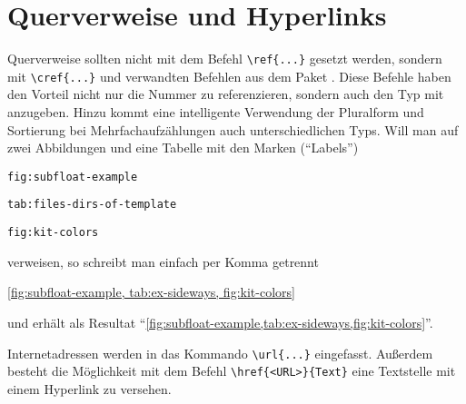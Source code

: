 \section{Querverweise und Hyperlinks}%
\label{sec:Querverweise}
%
Querverweise sollten nicht mit dem Befehl \lstinline|\ref{...}| gesetzt werden,
sondern mit \lstinline|\cref{...}| und verwandten Befehlen aus dem Paket
 \cite{Cubitt2013}.
Diese Befehle haben den Vorteil nicht nur die Nummer zu referenzieren,
sondern auch den Typ mit anzugeben.
Hinzu kommt eine intelligente Verwendung der Pluralform und
Sortierung bei Mehrfachaufzählungen auch unterschiedlichen Typs.
Will man \bspw auf zwei Abbildungen und eine Tabelle mit den Marken (\enquote{Labels})
%
\begin{itemize*}
\item \texttt{fig:subfloat-example}
\item \texttt{tab:files-dirs-of-template}
\item \texttt{fig:kit-colors}
\end{itemize*}
%
verweisen, so schreibt man einfach per Komma getrennt
%
\begin{latex}[caption={Cleveres Referenzieren mit \bs cref},label={lst:cref}]
\cref{fig:subfloat-example,
      tab:ex-sideways,
      fig:kit-colors}
\end{latex}
%
und erhält als Resultat
\enquote{\cref{fig:subfloat-example,tab:ex-sideways,fig:kit-colors}}.

Internetadressen werden in das Kommando \lstinline|\url{...}| eingefasst.
Außerdem besteht die Möglichkeit mit dem Befehl \lstinline|\href{<URL>}{Text}| eine Textstelle mit einem Hyperlink zu versehen.